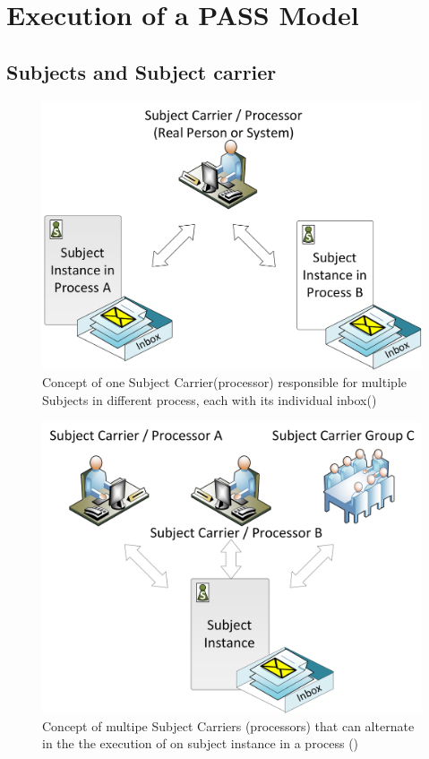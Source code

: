 \chapter{Execution of a PASS Model}
\label{PASSExec}

\section{Subjects and Subject carrier}
\label{sec:subjectCarrier} 

\begin{figure}[htbp]
	\centering
	\includegraphics[width=0.5\linewidth]{Figures/SubjectCarrierConcept1.png}
	\caption[Concept of one Subject Carrier(processor) responsible for multiple Subjects in different process, each with its individual inbox (\cite{elstermann:diss})]{Concept of one Subject Carrier(processor) responsible for multiple Subjects in different process, each with its individual inbox(\cite{elstermann:diss})}
	\label{fig:subjectCarrierConcept1}
\end{figure}

\begin{figure}[htbp]
	\centering
	\includegraphics[width=0.5\linewidth]{Figures/SubjectCarrierConcept2.png}
	\caption[Concept of multipe Subject Carriers (processors) that can alternate in the the execution of on subject instance in a process (\cite{elstermann:diss})]{Concept of multipe Subject Carriers (processors) that can alternate in the the execution of on subject instance in a process (\cite{elstermann:diss})}
	\label{fig:subjectCarrierConcept2}
\end{figure}

